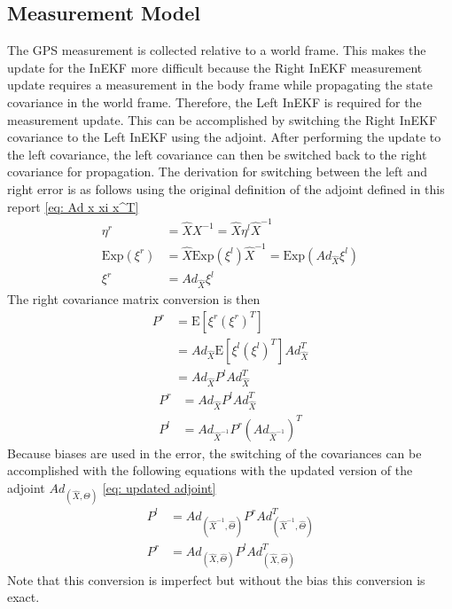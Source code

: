\subsection{Measurement Model}
The GPS measurement is collected relative to a world frame. This makes the update for the InEKF more difficult because the Right InEKF measurement update requires a measurement in the body frame while propagating the state covariance in the world frame. Therefore, the Left InEKF is required for the measurement update. This can be accomplished by switching the Right InEKF covariance to the Left InEKF using the adjoint. After performing the update to the left covariance, the left covariance can then be switched back to the right covariance for propagation. The derivation for switching between the left and right error is as follows \cite{Contact-Aided_Invarant_EKF} using the original definition of the adjoint defined in this report \eqref{eq: Ad x xi x^T} 
\begin{equation}
    \begin{split}
        \eta^r &= \hat{X} X^{-1} = \hat{X} \eta^l \hat{X}^{-1} \\
        \text{Exp}(\xi^r) &= \hat{X} \text{Exp}(\xi^l) \hat{X}^{-1} = \text{Exp}(Ad_{\hat{X}} \xi^l) \\
        \xi^r &= Ad_{\hat{X}} \xi^l
    \end{split}
    \label{eq: xi^l -> xi^r}
\end{equation}
The right covariance matrix conversion is then
\begin{equation}
    \begin{split}
        P^r &= \mathrm{E}[\xi^r (\xi^r)^T] \\
            &= Ad_{\hat{X}} \mathrm{E}[\xi^l (\xi^l)^T] Ad_{\hat{X}}^T \\
            &= Ad_{\hat{X}} P^l Ad_{\hat{X}}^T
        \label{eq: Adj no bias left to right}
    \end{split}
\end{equation}
\begin{equation}
    \begin{split}
        P^r &= Ad_{\hat{X}} P^l Ad_{\hat{X}}^T \\
        P^l &= Ad_{\hat{X}^{-1}} P^r (Ad_{\hat{X}^{-1}})^T 
        \label{eq: Adj no bias left to right with bias}
    \end{split}
\end{equation}
Because biases are used in the error, the switching of the covariances can be accomplished with the following equations with the updated version of the adjoint $Ad_{(\hat{X},\Theta)}$ \eqref{eq: updated adjoint}
\begin{subequations}
    \begin{align}
        P^l &= Ad_{(\hat{X}^{-1},\hat{\Theta})} P^r Ad_{(\hat{X}^{-1},\hat{\Theta})}^T 
        \label{eq: Switch covariance left/right} \\
        P^r &= Ad_{(\hat{X},\hat{\Theta})} P^l Ad_{(\hat{X},\hat{\Theta})}^T 
        \label{eq: Switch covariance right/left}
    \end{align}
\end{subequations}
Note that this conversion is imperfect but without the bias this conversion is exact. 


